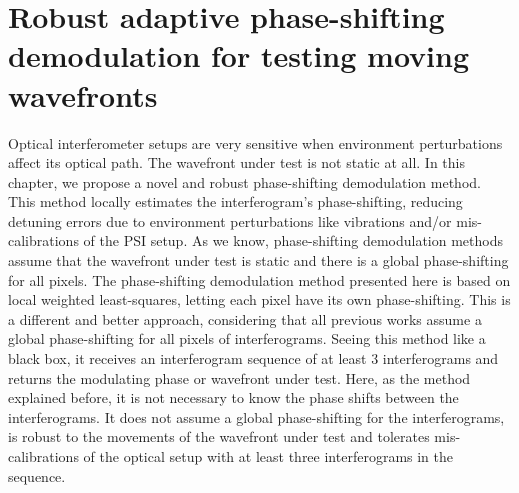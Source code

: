 \chapter{Robust adaptive phase-shifting demodulation for testing moving 
wavefronts}


Optical interferometer setups are very sensitive when environment
perturbations affect its optical path. The wavefront under test is not
static at all. In this chapter, we propose a novel and robust phase-shifting
demodulation method. This method locally estimates the interferogram's
phase-shifting, reducing detuning errors due to environment perturbations
like vibrations and/or mis-calibrations of the PSI setup. 
As we know, phase-shifting demodulation methods assume that the
wavefront under test is static and there is a global phase-shifting for all
pixels. The phase-shifting demodulation method presented here is based on
local weighted least-squares, letting each pixel have its own phase-shifting.
This is a different and better approach, considering that all previous works
assume a global phase-shifting for all pixels of interferograms. Seeing this
method like a black box, it receives an interferogram sequence of at least 3
interferograms and returns the modulating phase or wavefront under test.
Here, as the method explained before, it is not necessary to know the phase 
shifts between the interferograms.
It does not assume a global phase-shifting for the interferograms, is robust
to the movements of the wavefront under test and tolerates
mis-calibrations of the optical setup with at least three
interferograms in the sequence.

